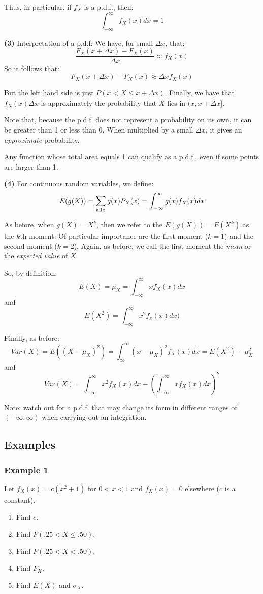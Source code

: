 \documentclass[12pt]{article}
\begin{document}
Thus, in particular, if $f_X$ is a p.d.f., then:
\[
    \int_{-\infty}^{\infty} f_X (x) dx = 1
\]

\textbf{(3)} Interpretation of a p.d.f: We have, for small $\Delta x$, that:
\[
    \frac{F_X (x + \Delta x) - F_X (x)}{\Delta x} \approx f_X (x)
\]
So it follows that:
\[
    F_X (x+\Delta x) - F_X (x) \approx \Delta x f_X (x)
\]

But the left hand side is just $P(x < X \leq x + \Delta x)$. Finally, we have that $f_X (x) \Delta x$ is approximately the probability that $X$ lies in $(x, x + \Delta x]$. %

Note that, because the p.d.f. does not represent a probability on its own, it can be greater than 1 or less than 0. When multiplied by a small $\Delta x$, it gives an \emph{approximate} probability.

Any function whose total area equals 1 can qualify as a p.d.f., even if some points are larger than 1.

\textbf{(4)} For continuous random variables, we define:
\[
    E(g(X)) = \sum_{\textnormal{all} x} g(x) P_X (x) = \int_{-\infty}^{\infty} g(x) f_X (x) dx
\]

As before, when $g(X) = X^k$, then we refer to the $E(g(X)) = E(X^k)$ as the $k$th moment. Of particular importance are the first moment ($k=1$) and the second moment ($k=2$). Again, as before, we call the first moment the \emph{mean} or the \emph{expected value} of $X$.

So, by definition:
\[
    E(X) = \mu_X = \int_{-\infty}^{\infty} x f_X (x) dx
\]
and
\[
    E(X^2) = \int_{-\infty}^{\infty} x^2 f_x (x) dx)
\]

Finally, as before:
\[
    Var(X) = E((X - \mu_X)^2) = \int_{\infty}^{\infty} (x - \mu_X)^2 f_X (x) dx = E(X^2) - \mu_X^2
\]
and
\[
    Var(X) = \int_{-\infty}^{\infty} x^2 f_X (x) dx - (\int_{-\infty}^{\infty} x f_X (x) dx)^2
\]

Note: watch out for a p.d.f. that may change its form in different ranges of $(-\infty,\infty)$ when carrying out an integration.

\subsection{Examples}
\subsubsection{Example 1}
Let $f_X (x) = c(x^2 + 1)$ for $0 < x < 1$ and $f_X (x) = 0$ elsewhere ($c$ is a constant).
\begin{enumerate}
    \item Find $c$.
    \item Find $P(.25 < X \leq .50)$.
    \item Find $P(.25 < X < .50)$.
    \item Find $F_X$.
    \item Find $E(X)$ and $\sigma_X$.
\end{enumerate}
\end{document}
